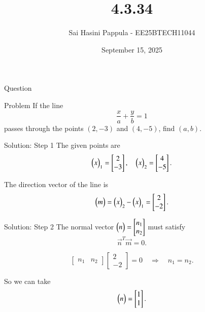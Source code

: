 \documentclass{beamer}
\title %
{4.3.34}
\date{September 15, 2025}
\author %
{Sai Hasini Pappula - EE25BTECH11044}
\begin{document}
\begin{frame}{Question}
\begin{block}{Problem}
If the line
\[
\frac{x}{a} + \frac{y}{b} = 1
\]
passes through the points $(2,-3)$ and $(4,-5)$, find $(a,b)$.
\end{block}
\end{frame}

\begin{frame}{Solution: Step 1}
The given points are
\begin{equation}
\begin{pmatrix}x\end{pmatrix}_1 = \begin{bmatrix}2\\-3\end{bmatrix}, \quad
\begin{pmatrix}x\end{pmatrix}_2 = \begin{bmatrix}4\\-5\end{bmatrix}.
\end{equation}

\bigskip
The direction vector of the line is
\begin{equation}
\begin{pmatrix}m\end{pmatrix} = \begin{pmatrix}x\end{pmatrix}_2 - \begin{pmatrix}x\end{pmatrix}_1
= \begin{bmatrix}2 \\ -2\end{bmatrix}.
\end{equation}
\end{frame}

\begin{frame}{Solution: Step 2}
The normal vector $\begin{pmatrix}n\end{pmatrix} = \begin{bmatrix}n_1 \\ n_2\end{bmatrix}$ must satisfy
\begin{equation}
\vec{n}^T \vec{m} = 0.
\end{equation}

\begin{equation}
\begin{bmatrix}n_1 & n_2\end{bmatrix}
\begin{bmatrix}2 \\ -2\end{bmatrix} = 0
\quad \Rightarrow \quad n_1 = n_2.
\end{equation}

So we can take
\begin{equation}
\begin{pmatrix}n\end{pmatrix} = \begin{bmatrix}1 \\ 1\end{bmatrix}.
\end{equation}
\end{frame}
\end{document}

